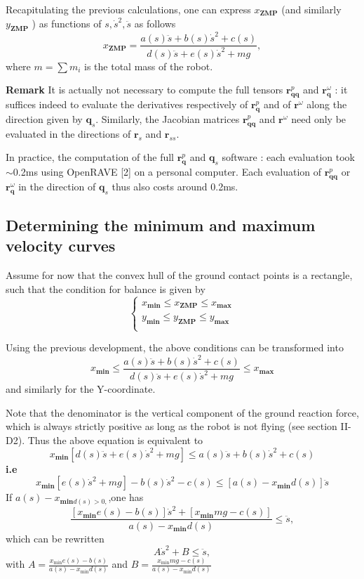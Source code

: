 \documentclass[journal]{IEEEtran}
\begin{document}
Recapitulating the previous calculations, one can express
$x_{\textbf{ZMP}}$ (and similarly $y_{\textbf{ZMP}}$ ) as functions of $s,\dot{s}^{2},\ddot{s}$ as follows
\begin{equation}
x_{\textbf{ZMP}}=\frac{a(s)\ddot{s}+b(s)\dot{s}^{2}+c(s)}{d(s)\ddot{s}+e(s)\dot{s}^{2}+mg},
\end{equation}
where $m=\sum m_{i}$ is the total mass of the robot.

\textbf{Remark} It is actually not necessary to compute the full tensors $\textbf{r}^{p}_{\textbf{qq}}$ and $\textbf{r}^{\omega}_{\textbf{q}}$ : it suffices indeed to evaluate the derivatives respectively of $\textbf{r}^{p}_{\textbf{q}}$ and of $\textbf{r}^{\omega}$ along the direction given by $\textbf{q}_{s}$. Similarly, the Jacobian matrices $\textbf{r}^{p}_{\textbf{qq}}$ and $\textbf{r}^{\omega}$ need only be evaluated in the directions of $\textbf{r}_{s}$ and $\textbf{r}_{ss}$.

In practice, the computation of the full $\textbf{r}^{p}_{\textbf{q}}$ and $\textbf{q}_{s}$ software : each evaluation took $\sim$0.2ms using OpenRAVE [2] on a personal computer. Each evaluation of $\textbf{r}^{p}_{\textbf{qq}}$ or $\textbf{r}^{\omega}_{\textbf{q}}$ in the direction of $\textbf{q}_{s}$ thus also costs around 0.2ms.
\subsection{Determining the minimum and maximum velocity curves}
Assume for now that the convex hull of the ground contact
points is a rectangle, such that the condition for balance is
given by
\begin{equation}
  \left\{
   \begin{array}{c}
   x_{\textbf{min}} \leq x_{\textbf{ZMP}} \leq x_{\textbf{max}}  \\
   y_{\textbf{min}} \leq y_{\textbf{ZMP}} \leq y_{\textbf{max}}  \\
   \end{array}
  \right.
\end{equation}

Using the previous development, the above conditions can
be transformed into
$$
x_{\textbf{min}} \leq \frac{a(s)\ddot{s}+b(s)\dot{s}^{2}+c(s)}{d(s)\ddot{s}+e(s)\dot{s}^{2}+mg}\leq x_{\textbf{max}}
$$
and similarly for the Y-coordinate. 

Note that the denominator is the vertical component of the ground reaction force, which is always strictly positive as long as the robot is not flying (see section II-D2). Thus the above equation is equivalent to
$$
x_{\textbf{min}}[d(s)\ddot{s}+e(s)\dot{s}^{2}+mg] \leq a(s)\ddot{s}+b(s)\dot{s}^{2}+c(s)
$$
\textbf{i.e}
$$
x_{\textbf{min}}[e(s)\dot{s}^{2}+mg]-b(s)\dot{s}^{2}-c(s) \leq [a(s)-x_{\textbf{min}}d(s)]\ddot{s}
$$
If $a(s)-x_{\textbf{min}d(s)>0,}$,one has
$$
\frac{[x_{\textbf{min}}e(s)-b(s)]\dot{s}^{2}+[x_{\textbf{min}}mg-c(s)]}{a(s)-x_{\textbf{min}}d(s)} \leq \ddot{s},
$$
which can be rewritten
\begin{equation}
A\dot{s}^{2}+B\leq \ddot{s},
\end{equation}
with $A=\frac{{x_{\min}}e(s)-b(s)}{a(s)-x_{{\min}}d(s)}$ and $B=\frac{{x_{\min}}mg-c(s)}{a(s)-x_{{\min}}d(s)}$
\end{document}
